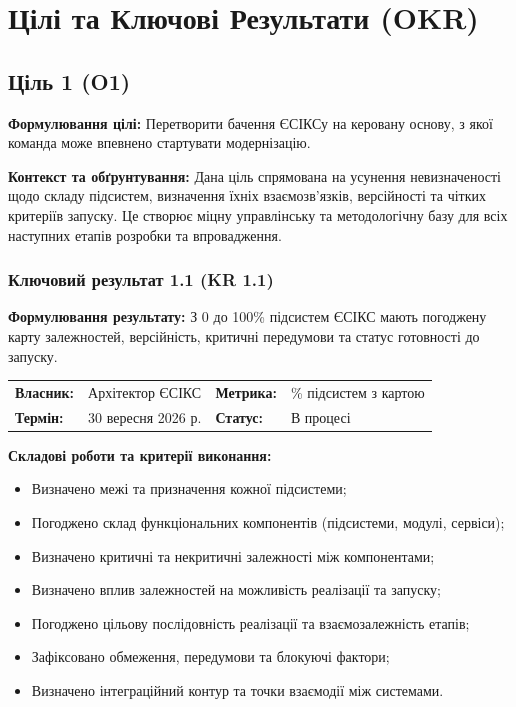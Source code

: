 \documentclass{article}
\begin{document}
\section{Цілі та Ключові Результати (OKR)}

\subsection{Ціль 1 (O1)}

\textbf{Формулювання цілі:} Перетворити бачення ЄСІКСу на керовану основу, з якої команда може впевнено стартувати модернізацію.

\textbf{Контекст та обґрунтування:}
Дана ціль спрямована на усунення невизначеності щодо складу підсистем, визначення їхніх взаємозв'язків, версійності та чітких критеріїв запуску. Це створює міцну управлінську та методологічну базу для всіх наступних етапів розробки та впровадження.

\subsubsection{Ключовий результат 1.1 (KR 1.1)}

\textbf{Формулювання результату:} З 0 до 100\% підсистем ЄСІКС мають погоджену карту залежностей, версійність, критичні передумови та статус готовності до запуску.

\noindent\begin{tabular}{@{}p{2.2cm}p{4.5cm}p{2.2cm}p{4.5cm}@{}}
\toprule
\textbf{Власник:} & Архітектор ЄСІКС & \textbf{Метрика:} & \% підсистем з картою \\
\textbf{Термін:} & 30 вересня 2026 р. & \textbf{Статус:} & В процесі \\
\bottomrule
\end{tabular}

\vspace{10pt}
\textbf{Складові роботи та критерії виконання:}
\begin{itemize}
    \item Визначено межі та призначення кожної підсистеми;
    \item Погоджено склад функціональних компонентів (підсистеми, модулі, сервіси);
    \item Визначено критичні та некритичні залежності між компонентами;
    \item Визначено вплив залежностей на можливість реалізації та запуску;
    \item Погоджено цільову послідовність реалізації та взаємозалежність етапів;
    \item Зафіксовано обмеження, передумови та блокуючі фактори;
    \item Визначено інтеграційний контур та точки взаємодії між системами.
\end{itemize}
\end{document}

